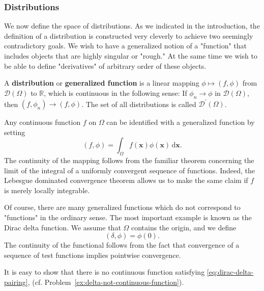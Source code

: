 \subsubsection{Distributions}\label{subsec:distributions-definition}

We now define the space of distributions. As we indicated in the introduction, the definition of a distribution is constructed very cleverly to achieve two seemingly contradictory goals. We wish to have a generalized notion of a "function" that includes objects that are highly singular or "rough." At the same time we wish to be able to define "derivatives" of arbitrary order of these objects.

\begin{Definition}
\label{def:distribution}
A \textbf{distribution} or \textbf{generalized function} is a linear mapping $\phi\mapsto(f,\phi)$ from $\mathcal{D}(\Omega)$ to $\mathbb{R}$, which is continuous in the following sense: If $\phi_n\to\phi$ in $\mathcal{D}(\Omega)$, then $(f,\phi_n)\to(f,\phi)$. The set of all distributions is called $\mathcal{D}^{\prime}(\Omega)$.
\end{Definition}

\begin{Example}
\label{ex:regular-distribution}
Any continuous function $f$ on $\Omega$ can be identified with a generalized function by setting
\begin{equation}\label{eq:regular-distribution-pairing}
(f,\phi)=\int_\Omega f(\bm{x})\phi(\bm{x})\,\mathrm{d}\bm{x}.
\end{equation}
The continuity of the mapping follows from the familiar theorem concerning the limit of the integral of a uniformly convergent sequence of functions. Indeed, the Lebesgue dominated convergence theorem allows us to make the same claim if $f$ is merely locally integrable.
\end{Example}

\begin{Example}
\label{ex:dirac-delta}
Of course, there are many generalized functions which do not correspond to "functions" in the ordinary sense. The most important example is known as the Dirac delta function. We assume that $\Omega$ contains the origin, and we define
\begin{equation}\label{eq:dirac-delta-pairing}
(\delta,\phi)=\phi(0).
\end{equation}
The continuity of the functional follows from the fact that convergence of a sequence of test functions implies pointwise convergence.

It is easy to show that there is no continuous function satisfying \eqref{eq:dirac-delta-pairing}, (cf. Problem~\ref{ex:delta-not-continuous-function}).
\end{Example}

